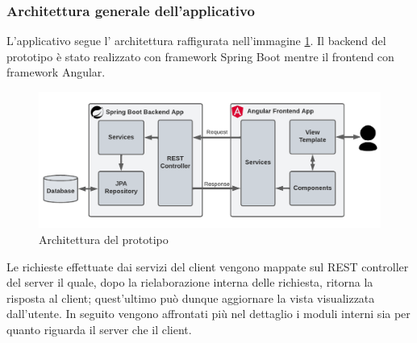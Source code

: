 \subsubsection*{Architettura generale dell'applicativo}
L'applicativo segue l' architettura raffigurata nell'immagine \ref{prototype-architecture}. Il backend del prototipo è stato realizzato con framework Spring Boot mentre il frontend con framework Angular.
\FloatBarrier
\begin{figure}[!h]
\centering
\includegraphics[width=1\linewidth]{immagini/prototypeArchitecture.pdf}
\caption{Architettura del prototipo}
\label{prototype-architecture}
\end{figure}
\FloatBarrier
Le richieste effettuate dai servizi del client vengono mappate sul REST controller del server il quale, dopo la rielaborazione interna delle richiesta, ritorna la risposta al client; quest'ultimo può dunque aggiornare la vista visualizzata dall'utente. In seguito vengono affrontati più nel dettaglio i moduli interni sia per quanto riguarda il server che il client.
